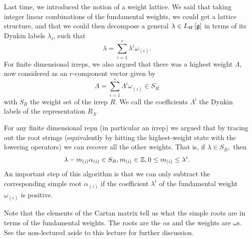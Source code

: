 Last time, we introduced the notion of a weight lattice. We said that taking integer linear combinations of the fundamental weights, we could get a lattice structure, and that we could then decompose a general $\lambda \in L_W[\mathfrak{g}]$ in terms of its Dynkin labels $\lambda_i$, such that
$$\lambda=\sum_{i=1}^r \lambda^i \omega_{(i)}.$$
For finite dimensional irreps, we also argued that there was a highest weight $\Lambda$, now considered as an $r$-component vector given by
$$\Lambda=\sum_{i=1}^r \Lambda^i \omega_{(i)}\in S_R$$
with $S_R$ the weight set of the irrep $R$. We call the coefficients $\Lambda^i$ the Dynkin labels of the representation $R_\Lambda$.

For any finite dimensional repn (in particular an irrep) we argued that by tracing out the root strings (equivalently by hitting the highest-weight state with the lowering operators) we can recover all the other weights. That is, if $\lambda \in S_R,$ then
$$\lambda-m_{(i)} \alpha_{(i)} \in S_R, m_{(i)}\in \mathbb{Z}, 0\leq m_{(i)}\leq \lambda^i.$$
An important step of this algorithm is that we can only subtract the corresponding simple root $\alpha_{(i)}$ if the coefficient $\lambda^i$ of the fundamental weight $\omega_{(i)}$ is positive.

Note that the elements of the Cartan matrix tell us what the simple roots are in terms of the fundamental weights. The roots are the $\alpha$s and the weights are $\omega$s. See the non-lectured aside to this lecture for further discussion.

